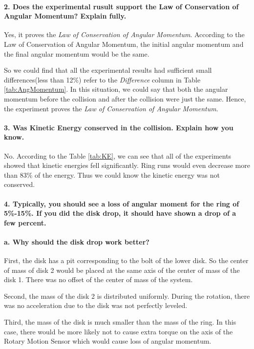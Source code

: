\paragraph{2. Does the experimental rusult support the Law of Conservation of Angular Momentum? Explain fully.}
Yes, it proves the \emph{Law of Conservation of
  Angular Momentum}. According to the Law of Conservation of Angular Momentum, the initial angular momentum and the final angular momentum would be the same.\par
So we could find that all the experimental results had sufficient small differences(less than 12\%) refer to the \emph{Difference} column in Table \ref{tab:AngMomentum}. In this situation, we could say that both the angular momentum before the collision and after the collision were just the same. Hence, the experiment proves the \emph{Law of Conservation of Angular Momentum}.
\paragraph{3. Was Kinetic Energy conserved in the collision. Explain how you know.}
No. According to the Table \ref{tab:KE}, we can see that all of the experiments showed that kinetic energies fell significantly. Ring runs would even decrease more than 83\% of the energy. Thus we could know the kinetic energy was not conserved.
\paragraph{4. Typically, you should see a loss of angular moment for the ring of 5\%-15\%. If you did the disk drop, it should have shown a drop of a few percent.}
\paragraph{a. Why should the disk drop work better?}First, the disk has a pit corresponding to the bolt of the lower disk. So the center of mass of disk 2 would be placed at the same axis of the center of mass of the disk 1. There was no offset of the center of mass of the system.\par
Second, the mass of the disk 2 is distributed uniformly. During the rotation, there was no acceleration due to the disk was not perfectly leveled.\par
Third, the mass of the disk is much smaller than the mass of the ring. In this case, there would be more likely not to cause extra torque on the axis of the Rotary Motion Sensor which would cause loss of angular momentum.
